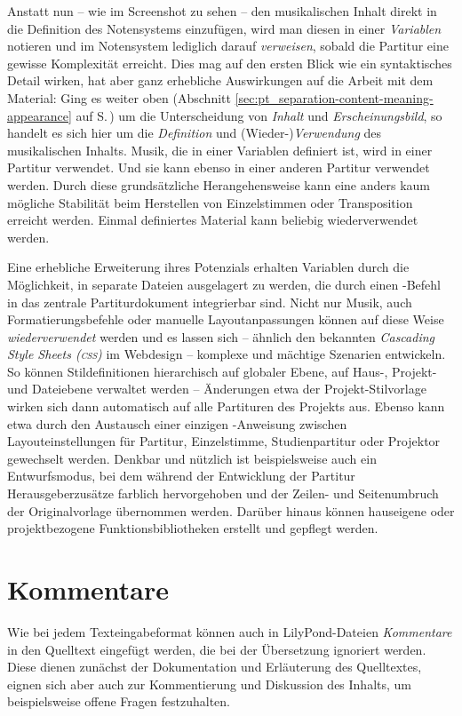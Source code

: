 \documentclass[DIV=12]{scrreprt}
\begin{document}
Anstatt nun -- wie im Screenshot zu sehen -- den musikalischen Inhalt direkt in die Definition des Notensystems einzufügen, wird man diesen in einer \emph{Variablen} notieren und im Notensystem lediglich darauf \emph{verweisen}, sobald die Partitur eine gewisse Komplexität erreicht.
Dies mag auf den ersten Blick wie ein syntaktisches Detail wirken, hat aber ganz erhebliche Auswirkungen auf die Arbeit mit dem Material:
Ging es weiter oben (Abschnitt \ref{sec:pt_separation-content-meaning-appearance} auf S.\,\pageref{sec:pt_separation-content-meaning-appearance}) um die Unterscheidung von \emph{Inhalt} und \emph{Erscheinungsbild}, so handelt es sich hier um die \emph{Definition} und (Wieder-)\emph{Verwendung} des musikalischen Inhalts.
Musik, die in einer Variablen definiert ist, wird in einer Partitur verwendet.
Und sie kann ebenso in einer anderen Partitur verwendet werden.
Durch diese grundsätzliche Herangehensweise kann eine anders kaum mögliche Stabilität beim Herstellen von Einzelstimmen oder Transposition erreicht werden.
Einmal definiertes Material kann beliebig wiederverwendet werden.

\medskip
Eine erhebliche Erweiterung ihres Potenzials erhalten Variablen durch die Möglichkeit, in separate Dateien ausgelagert zu werden, die durch einen -Befehl in das zentrale Partiturdokument integrierbar sind.
Nicht nur Musik, auch Formatierungsbefehle oder manuelle Layoutanpassungen können auf diese Weise \emph{wiederverwendet} werden und es lassen sich -- ähnlich den bekannten \emph{Cascading Style Sheets (\textsc{css})} im Webdesign -- komplexe und mächtige Szenarien entwickeln.
So können Stildefinitionen hierarchisch auf globaler Ebene, auf Haus-, Projekt- und Dateiebene verwaltet werden -- Änderungen etwa der Projekt-Stilvorlage wirken sich dann automatisch auf alle Partituren des Projekts aus.
Ebenso kann etwa durch den Austausch einer einzigen -Anweisung zwischen Layouteinstellungen für Partitur, Einzelstimme, Studienpartitur oder Projektor gewechselt werden.
Denkbar und nützlich ist beispielsweise auch ein Entwurfsmodus, bei dem während der Entwicklung der Partitur Herausgeberzusätze farblich hervorgehoben und der Zeilen- und Seitenumbruch der Originalvorlage übernommen werden.
Darüber hinaus können hauseigene oder projektbezogene Funktionsbibliotheken erstellt und gepflegt werden.

\section{Kommentare}
\label{sec:pt_lilypond-comments}
Wie bei jedem Texteingabeformat können auch in LilyPond-Dateien \emph{Kommentare} in den Quelltext eingefügt werden, die bei der Übersetzung ignoriert werden.
Diese dienen zunächst der Dokumentation und Erläuterung des Quelltextes, eignen sich aber auch zur Kommentierung und Diskussion des Inhalts, um beispielsweise offene Fragen festzuhalten.
\end{document}
